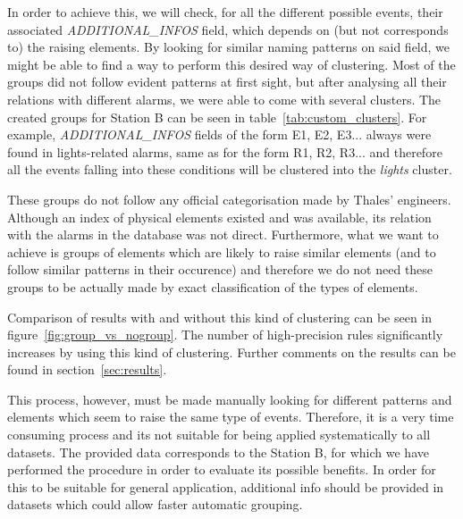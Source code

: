 In order to achieve this, we will check, for all the different possible events, their associated \emph{ADDITIONAL\_INFOS} field, which depends on (but not corresponds to) the raising elements. By looking for similar naming patterns on said field, we might be able to find a way to perform this desired way of clustering. Most of the groups did not follow evident patterns at first sight, but after analysing all their relations with different alarms, we were able to come with several clusters. The created groups for Station B can be seen in table~\ref{tab:custom_clusters}. For example, \emph{ADDITIONAL\_INFOS} fields of the form E1, E2, E3... always were found in lights-related alarms, same as for the form R1, R2, R3... and therefore all the events falling into these conditions will be clustered into the \emph{lights} cluster.

These groups do not follow any official categorisation made by Thales' engineers. Although an index of physical elements existed and was available, its relation with the alarms in the database was not direct. Furthermore, what we want to achieve is groups of elements which are likely to raise similar elements (and to follow similar patterns in their occurence) and therefore we do not need these groups to be actually made by exact classification of the types of elements.

Comparison of results with and without this kind of clustering can be seen in figure~\ref{fig:group_vs_nogroup}. The number of high-precision rules significantly increases by using this kind of clustering. Further comments on the results can be found in section~\ref{sec:results}.

This process, however, must be made manually looking for different patterns and elements which seem to raise the same type of events. Therefore, it is a very time consuming process and its not suitable for being applied systematically to all datasets. The provided data corresponds to the Station B, for which we have performed the procedure in order to evaluate its possible benefits. In order for this to be suitable for general application, additional info should be provided in datasets which could allow faster automatic grouping.

